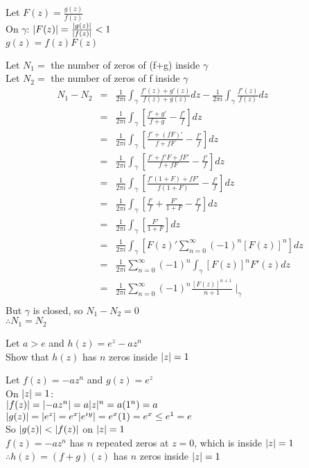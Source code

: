 \documentclass[letterpaper,12pt,fleqn]{article}
\newcommand{\g}{\gamma}
\begin{document}
\begin{theproof}
  Let $F(z)=\frac{g(z)}{f(z)}$ \\
  On $\g$: $\lvert F(z)\rvert=\frac{\lvert g(z)\rvert}{\lvert f(z)\rvert}<1$ \\
  $g(z)=f(z)F(z)$

  Let $N_1=$ the number of zeros of (f+g) inside $\g$ \\
  Let $N_2=$ the number of zeros of f inside $\g$
  \begin{eqnarray*}
    N_1-N_2 &=& \frac{1}{2\pi i}\int_{\g}\frac{f'(z)+g'(z)}{f(z)+g(z)}dz-
    \frac{1}{2\pi i}\int_{\g}\frac{f'(z)}{f(z)}dz \\
    &=& \frac{1}{2\pi i}\int_{\g}\left[\frac{f'+g'}{f+g}-\frac{f'}{f}
      \right]dz \\
    &=& \frac{1}{2\pi i}\int_{\g}\left[\frac{f'+(fF)'}{f+fF}-\frac{f'}{f}
      \right]dz \\
    &=& \frac{1}{2\pi i}\int_{\g}\left[\frac{f'+f'F+fF'}{f+fF}-\frac{f'}{f}
      \right]dz \\
    &=& \frac{1}{2\pi i}\int_{\g}\left[\frac{f'(1+F)+fF'}{f(1+F)}-\frac{f'}{f}
      \right]dz \\
    &=& \frac{1}{2\pi i}\int_{\g}\left[\frac{f'}{f}+\frac{F'}{1+F}-\frac{f'}{f}
      \right]dz \\
    &=& \frac{1}{2\pi i}\int_{\g}\left[\frac{F'}{1+F}\right]dz \\
    &=& \frac{1}{2\pi i}\int_{\g}\left[F(z)'\sum_{n=0}^{\infty}(-1)^n[F(z)]^n
      \right]dz \\
    &=& \frac{1}{2\pi i}\sum_{n=0}^{\infty}(-1)^n\int_{\g}[F(z)]^nF'(z)dz \\
    &=& \frac{1}{2\pi i}\sum_{n=0}^{\infty}(-1)^n\frac{[F(z)]^{n+1}}{n+1}
    \mid_{\g} \\
  \end{eqnarray*}
  But $\g$ is closed, so $N_1-N_2=0$ \\
  $\therefore N_1=N_2$
\end{theproof}

\begin{example}
  Let $a>e$ and $h(z)=e^z-az^n$ \\
  Show that $h(z)$ has $n$ zeros inside $\lvert z\rvert=1$

  Let $f(z)=-az^n$ and $g(z)=e^z$ \\
  On $\lvert z\rvert=1$: \\
  $\lvert f(z)\rvert=\lvert-az^n\rvert=a\lvert z\rvert^n=a(1^n)=a$ \\
  $\lvert g(z)\rvert=\lvert e^z\rvert=e^x\lvert e^{iy}\rvert=e^x(1)=e^x\le e^1=e$ \\
  So $\lvert g(z)\rvert<\lvert f(z)\rvert$ on $\lvert z\rvert=1$ \\

  $f(z)=-az^n$ has $n$ repeated zeros at $z=0$, which is inside $\lvert z\rvert=1$ \\
  $\therefore h(z)=(f+g)(z)$ has $n$ zeros inside $\lvert z\rvert=1$
\end{example}
\end{document}
